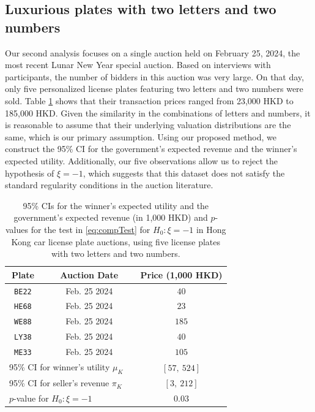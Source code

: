 \subsection{Luxurious plates with two letters and two numbers}

Our second analysis focuses on a single auction held on February 25, 2024, the most recent Lunar New Year special auction. Based on interviews with participants, the number of bidders in this auction was very large. On that day, only five personalized license plates featuring two letters and two numbers were sold. Table \ref{tab:case21} shows that their transaction prices ranged from 23,000 HKD to 185,000 HKD. Given the similarity in the combinations of letters and numbers, it is reasonable to assume that their underlying valuation distributions are the same, which is our primary assumption. Using our proposed method, we construct the 95\% CI for the government's expected revenue and the winner's expected utility. Additionally, our five observations allow us to reject the hypothesis of $\xi =-1$, which suggests that this dataset does not satisfy the standard regularity conditions in the auction literature.

\begin{table}
\renewcommand{\arraystretch}{1.5}
\centering
\begin{tabular}{ccccc}
\hline\hline
Plate &  & Auction Date &  & Price (1,000 HKD) \\ \hline
\texttt{BE22} &  & Feb. 25 2024 &  & $40$ \\ 
\texttt{HE68} &  & Feb. 25 2024 &  & $23$ \\ 
\texttt{WE88} &  & Feb. 25 2024 &  & $185$ \\ 
\texttt{LY38} &  & Feb. 25 2024 &  & $40$ \\ 
\texttt{ME33} &  & Feb. 25 2024 &  & $105$ \\ \hline
\multicolumn{3}{l}{95\% CI for winner's utility $\mu _{K}$} &  & $[57,~524]$ \\ 
\multicolumn{3}{l}{95\% CI for seller's revenue $\pi _{K}$} &  & $[3, ~212]$ \\ 
\multicolumn{3}{l}{$p$-value for $H_{0}:\xi =-1$} &  & $0.03$ \\ 
\hline\hline
\end{tabular}
\caption{95\% CIs for the winner's expected utility and the government's expected revenue (in 1,000 HKD) and $p$-values for the test in \eqref{eq:compTest} for $H_0:\xi = -1$ in Hong Kong car license plate auctions, using five license plates with two letters and two numbers.}\label{tab:case21}
\end{table}

